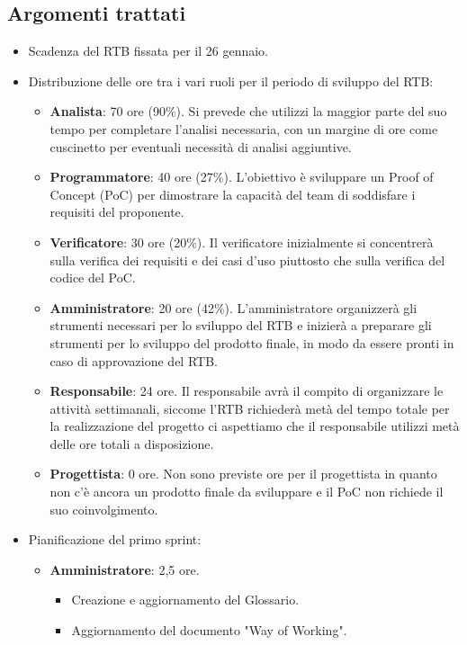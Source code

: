\documentclass[a4paper, 12pt]{article}
\begin{document}
\subsection{Argomenti trattati}
\begin{itemize}
    \item Scadenza del RTB fissata per il 26 gennaio.
    \item Distribuzione delle ore tra i vari ruoli per il periodo di sviluppo del RTB:
    \begin{itemize}
        \item \textbf{Analista}: 70 ore (90\%). Si prevede che utilizzi la maggior parte del suo tempo per completare l'analisi necessaria, con un margine di ore come cuscinetto per eventuali necessità di analisi aggiuntive.
        \item \textbf{Programmatore}: 40 ore (27\%). L'obiettivo è sviluppare un Proof of Concept (PoC) per dimostrare la capacità del team di soddisfare i requisiti del proponente.
        \item \textbf{Verificatore}: 30 ore (20\%). Il verificatore inizialmente si concentrerà sulla verifica dei requisiti e dei casi d'uso piuttosto che sulla verifica del codice del PoC.
        \item \textbf{Amministratore}: 20 ore (42\%). L'amministratore organizzerà gli strumenti necessari per lo sviluppo del RTB e inizierà a preparare gli strumenti per lo sviluppo del prodotto finale, in modo da essere pronti in caso di approvazione del RTB.
        \item \textbf{Responsabile}: 24 ore. Il responsabile avrà il compito di organizzare le attività settimanali, siccome l'RTB richiederà metà del tempo totale per la realizzazione del progetto ci aspettiamo che il responsabile utilizzi metà delle ore totali a disposizione.
        \item \textbf{Progettista}: 0 ore. Non sono previste ore per il progettista in quanto non c'è ancora un prodotto finale da sviluppare e il PoC non richiede il suo coinvolgimento.
    \end{itemize}
    \item Pianificazione del primo sprint:
    \begin{itemize}
        \item \textbf{Amministratore}: 2,5 ore.
            \begin{itemize}
                \item Creazione e aggiornamento del Glossario.
                \item Aggiornamento del documento "Way of Working".

\end{itemize}
\end{itemize}
\end{itemize}
\end{document}
